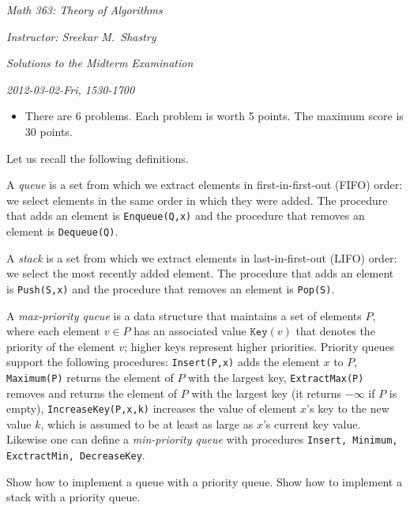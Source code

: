 \documentclass[10pt,reqno]{amsart}
\begin{document}
\noindent \textit{Math 363: Theory of Algorithms}

\noindent \textit{Instructor: Sreekar M.~Shastry}

\noindent \textit{Solutions to the Midterm Examination}

\noindent \textit{2012-03-02-Fri, 1530-1700}

\medskip

\begin{itemize}
    \item There are 6 problems. Each problem is worth 5 points. The
        maximum score is 30 points.
\end{itemize}

\medskip

\begin{outline}[enumerate]
\1 Let us recall the following definitions.

A \emph{queue} is a set from which we extract elements in first-in-first-out
(FIFO) order: we select elements in the same order in which they were added.
The procedure that adds an element is \texttt{Enqueue(Q,x)} and the procedure
that removes an element is \texttt{Dequeue(Q)}.

A \emph{stack} is a set from which we extract elements in last-in-first-out
(LIFO) order: we select the most recently added element. The procedure that
adds an element is \texttt{Push(S,x)} and the procedure that removes an element
is \texttt{Pop(S)}.

A \emph{max-priority queue} is a data structure that maintains a set of
elements $P$, where each element $v\in P$ has an associated value
$\mathtt{Key}(v)$ that denotes the priority of the element $v$; higher keys
represent higher priorities. Priority queues support the following procedures:
\texttt{Insert(P,x)} adds the element $x$ to $P$, \texttt{Maximum(P)} returns
the element of $P$ with the largest key, \texttt{ExtractMax(P)} removes and
returns the element of $P$ with the largest key (it returns \(-\infty\) if $P$
is empty), \texttt{IncreaseKey(P,x,k)} increases the value of element $x$'s key
to the new value $k$, which is assumed to be at least as large as $x$'s current
key value. Likewise one can define a \emph{min-priority queue} with procedures
\texttt{Insert, Minimum, ExctractMin, DecreaseKey}.

\2 Show how to implement a queue with a priority queue.
\2 Show how to implement a stack with a priority queue.


\end{outline}
\end{document}
